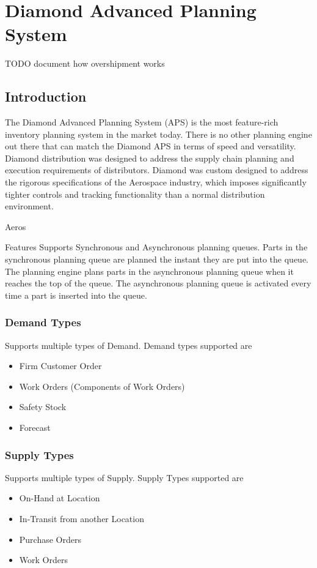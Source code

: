 	



\part{Diamond Advanced Planning System}
TODO document how overshipment works
\chapter{Introduction}
The Diamond Advanced Planning System (APS) is the most feature-rich inventory planning system in the market today. There is no other planning engine out there that can match the Diamond APS in terms of speed and versatility. Diamond distribution was designed to address the supply chain planning and execution requirements of distributors.  Diamond was custom designed to address the rigorous specifications of the Aerospace industry, which imposes significantly tighter controls and tracking functionality than a normal distribution environment.

Aeros

Features
Supports Synchronous and Asynchronous planning queues. Parts in the synchronous planning queue are planned the instant they are put into the queue. The planning engine plans parts in the asynchronous planning queue when it reaches the top of the queue. The asynchronous planning queue is activated every time a part is inserted into the queue.

\section{Demand Types}
Supports multiple types of Demand. Demand types supported are
\begin{itemize}
\item Firm Customer Order
\item Work Orders (Components of Work Orders)
\item Safety Stock
\item Forecast
\end{itemize}
\section{Supply Types}
Supports multiple types of Supply. Supply Types supported are
\begin{itemize}
\item On-Hand at Location
\item In-Transit from another Location
\item Purchase Orders
\item Work Orders 
\end{itemize}
